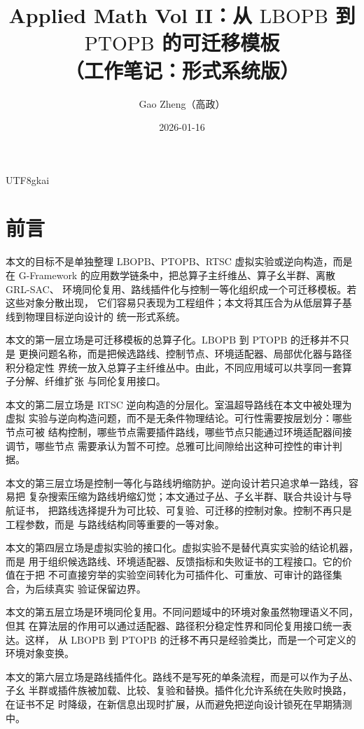 \documentclass[12pt]{article}
\newcommand{\GFramework}{\textsf{G-Framework}}
\newcommand{\LBOPB}{\ensuremath{\mathrm{LBOPB}}}
\newcommand{\PTOPB}{\ensuremath{\mathrm{PTOPB}}}
\begin{document}
\begin{CJK*}{UTF8}{gkai}

\title{Applied Math Vol II：从 \LBOPB{} 到 \PTOPB{} 的可迁移模板\\（工作笔记：形式系统版）}
\author{Gao Zheng（高政）}
\date{2026-01-16}
\maketitle

\section*{前言}

本文的目标不是单独整理 \LBOPB{}、\PTOPB{}、RTSC 虚拟实验或逆向构造，而是在
\GFramework{} 的应用数学链条中，把总算子主纤维丛、算子幺半群、离散 GRL-SAC、
环境同伦复用、路线插件化与控制一等化组织成一个可迁移模板。若这些对象分散出现，
它们容易只表现为工程组件；本文将其压合为从低层算子基线到物理目标逆向设计的
统一形式系统。

本文的第一层立场是可迁移模板的总算子化。\LBOPB{} 到 \PTOPB{} 的迁移并不只是
更换问题名称，而是把候选路线、控制节点、环境适配器、局部优化器与路径积分稳定性
界统一放入总算子主纤维丛中。由此，不同应用域可以共享同一套算子分解、纤维扩张
与同伦复用接口。

本文的第二层立场是 RTSC 逆向构造的分层化。室温超导路线在本文中被处理为虚拟
实验与逆向构造问题，而不是无条件物理结论。可行性需要按层划分：哪些节点可被
结构控制，哪些节点需要插件路线，哪些节点只能通过环境适配器间接调节，哪些节点
需要承认为暂不可控。总雅可比间隙给出这种可控性的审计判据。

本文的第三层立场是控制一等化与路线坍缩防护。逆向设计若只追求单一路线，容易把
复杂搜索压缩为路线坍缩幻觉；本文通过子丛、子幺半群、联合共设计与导航证书，
把路线选择提升为可比较、可复验、可迁移的控制对象。控制不再只是工程参数，而是
与路线结构同等重要的一等对象。

本文的第四层立场是虚拟实验的接口化。虚拟实验不是替代真实实验的结论机器，而是
用于组织候选路线、环境适配器、反馈指标和失败证书的工程接口。它的价值在于把
不可直接穷举的实验空间转化为可插件化、可重放、可审计的路径集合，为后续真实
验证保留边界。

本文的第五层立场是环境同伦复用。不同问题域中的环境对象虽然物理语义不同，但其
在算法层的作用可以通过适配器、路径积分稳定性界和同伦复用接口统一表达。这样，
从 \LBOPB{} 到 \PTOPB{} 的迁移不再只是经验类比，而是一个可定义的环境对象变换。

本文的第六层立场是路线插件化。路线不是写死的单条流程，而是可以作为子丛、子幺
半群或插件族被加载、比较、复验和替换。插件化允许系统在失败时换路，在证书不足
时降级，在新信息出现时扩展，从而避免把逆向设计锁死在早期猜测中。


\end{CJK*}
\end{document}

